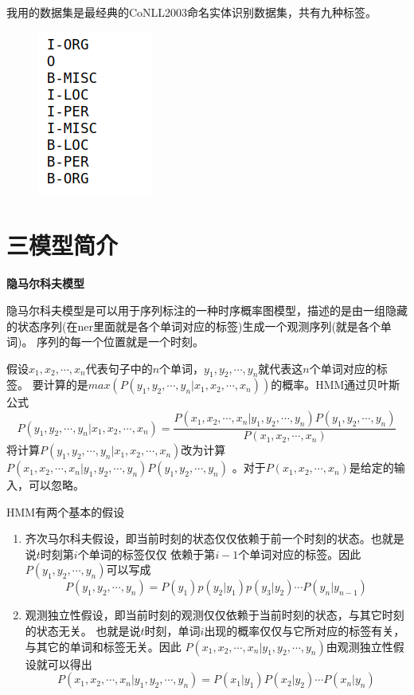\documentclass[openany,oneside]{ctexbook}
\begin{document}
我用的数据集是最经典的CoNLL2003命名实体识别数据集，共有九种标签。
\begin{figure}[htp]
   \centering
   \includegraphics[scale=0.8]{tags.png}
   
\end{figure}


\newpage
\chapter{\sihao\hei 三\quad 模型简介}
{\bfseries 隐马尔科夫模型}

隐马尔科夫模型是可以用于序列标注的一种时序概率图模型，描述的是由一组隐藏
的状态序列(在ner里面就是各个单词对应的标签)生成一个观测序列(就是各个单词)。
序列的每一个位置就是一个时刻。

假设$x_1,x_2,\cdots ,x_n$代表句子中的$n$个单词，$y_1,y_2,\cdots, y_n$就代表这$n$个单词对应的标签。
要计算的是$max(P(y_1,y_2,\cdots, y_n|x_1,x_2,\cdots,x_n))$的概率。HMM通过贝叶斯公式
\[
   P(y_1,y_2,\cdots, y_n|x_1,x_2,\cdots,x_n)=\displaystyle\frac{P(x_1,x_2,\cdots ,x_n|y_1,y_2,\cdots, y_n)P(y_1,y_2,\cdots, y_n)}{P(x_1,x_2,\cdots ,x_n)}
\]
将计算$P(y_1,y_2,\cdots, y_n|x_1,x_2,\cdots,x_n)$改为计算$P(x_1,x_2,\cdots ,x_n|y_1,y_2,\cdots, y_n)P(y_1,y_2,\cdots, y_n)$
。对于$P(x_1,x_2,\cdots ,x_n)$是给定的输入，可以忽略。

HMM有两个基本的假设
\begin{enumerate}
   \item 齐次马尔科夫假设，即当前时刻的状态仅仅依赖于前一个时刻的状态。也就是说$t$时刻第$i$个单词的标签仅仅
依赖于第$i-1$个单词对应的标签。因此$P(y_1,y_2,\cdots, y_n)$可以写成
\[
P(y_1,y_2,\cdots, y_n)=P(y_1)p(y_2|y_1)p(y_3|y_2)\cdots P(y_n|y_{n-1})
\]
   \item 观测独立性假设，即当前时刻的观测仅仅依赖于当前时刻的状态，与其它时刻的状态无关。
   也就是说$t$时刻，单词$i$出现的概率仅仅与它所对应的标签有关，与其它的单词和标签无关。因此
   $P(x_1,x_2,\cdots ,x_n|y_1,y_2,\cdots, y_n)$由观测独立性假设就可以得出
   \[
      P(x_1,x_2,\cdots ,x_n|y_1,y_2,\cdots, y_n)=P(x_1|y_1)P(x_2|y_2)\cdots P(x_n|y_n)
   \]

\end{enumerate}
\end{document}
